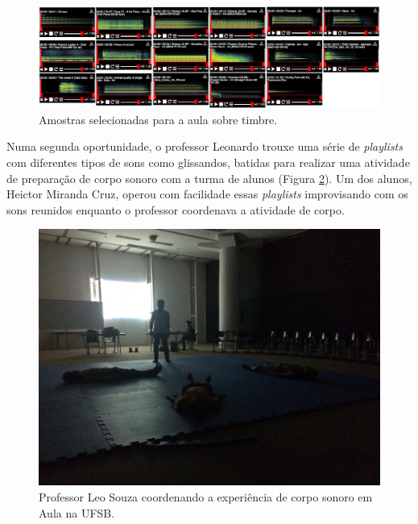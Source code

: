 \begin{figure}

\includegraphics[width=1\textwidth]{pictures/cap4/pstimbre}
\caption{\label{psorquestra}Amostras selecionadas para a aula sobre timbre.}
\label{fig:psorquestra}
\end{figure}

Numa segunda oportunidade, o professor Leonardo trouxe uma série de \emph{playlists} com diferentes tipos de sons como glissandos, batidas para realizar uma atividade de preparação de corpo sonoro com a turma de alunos (Figura \ref{fig:psufsb}). Um dos alunos, Heictor Miranda Cruz, operou com facilidade essas \emph{playlists} improvisando com os sons reunidos enquanto o professor coordenava a atividade de corpo. 



\begin{figure}

\includegraphics[width=1\textwidth]{pictures/cap4/leo_ufsb}
\caption{\label{psufsb}Professor Leo Souza coordenando a experiência de corpo sonoro em Aula na UFSB.}
\label{fig:psufsb}
\end{figure}

